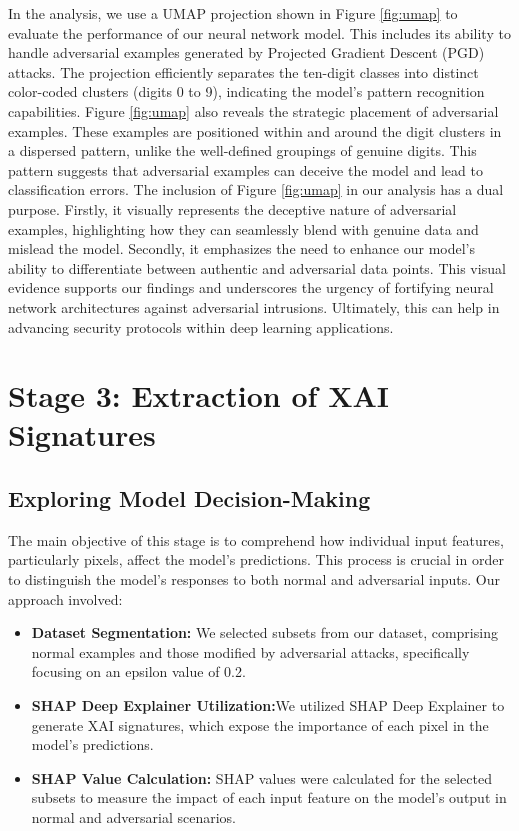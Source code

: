 \documentclass[10pt, conference, a4paper, final]{IEEEtran}
\begin{document}
In the analysis, we use a UMAP projection shown in Figure \ref{fig:umap} to evaluate the performance of our neural network model. This includes its ability to handle adversarial examples generated by Projected Gradient Descent (PGD) attacks. The projection efficiently separates the ten-digit classes into distinct color-coded clusters (digits 0 to 9), indicating the model's pattern recognition capabilities. Figure \ref{fig:umap} also reveals the strategic placement of adversarial examples. These examples are positioned within and around the digit clusters in a dispersed pattern, unlike the well-defined groupings of genuine digits. This pattern suggests that adversarial examples can deceive the model and lead to classification errors. The inclusion of Figure \ref{fig:umap} in our analysis has a dual purpose. Firstly, it visually represents the deceptive nature of adversarial examples, highlighting how they can seamlessly blend with genuine data and mislead the model. Secondly, it emphasizes the need to enhance our model's ability to differentiate between authentic and adversarial data points.
This visual evidence supports our findings and underscores the urgency of fortifying neural network architectures against adversarial intrusions. Ultimately, this can help in advancing security protocols within deep learning applications.




\section{Stage 3: Extraction of XAI Signatures}

\subsection{Exploring Model Decision-Making}
 The main objective of this stage is to comprehend how individual input features, particularly pixels, affect the model's predictions. This process is crucial in order to distinguish the model's responses to both normal and adversarial inputs.
Our approach involved:
\begin{itemize}
    \item \textbf{Dataset Segmentation:} We selected subsets from our dataset, comprising normal examples and those modified by adversarial attacks, specifically focusing on an epsilon value of 0.2.
    \item \textbf{SHAP Deep Explainer Utilization:}We utilized SHAP Deep Explainer to generate XAI signatures, which expose the importance of each pixel in the model's predictions.

    \item \textbf{SHAP Value Calculation:} SHAP values were calculated for the selected subsets to measure the impact of each input feature on the model's output in normal and adversarial scenarios.

\end{itemize}
\end{document}
